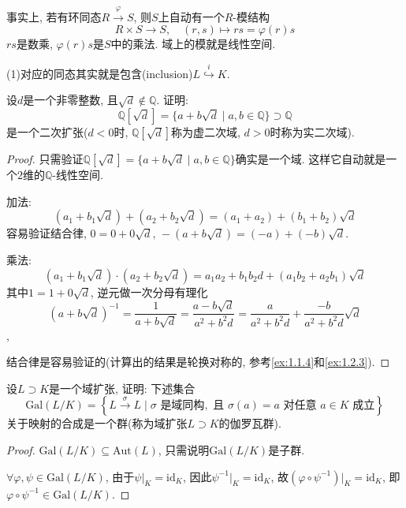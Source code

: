 \begin{remark}
    事实上, 若有环同态$R \overset{\varphi}\to S$, 则$S$上自动有一个$R$-模结构
    \[
        R \times S \to S, \quad (r, s) \mapsto rs = \varphi(r)s
    \]
    $rs$是数乘, $\varphi(r)s$是$S$中的乘法. 域上的模就是线性空间.
    
    (1)对应的同态其实就是包含(inclusion)$L \overset{i}\hookrightarrow K$.
\end{remark}

\begin{problem}
    设$d$是一个非零整数, 且$\sqrt d \notin \mathbb{Q}$. 证明:
    \[
        \mathbb{Q}[\sqrt{d}] = \{a + b\sqrt{d} \mid a, b \in \mathbb{Q}\} \supset \mathbb{Q}
    \]
    是一个二次扩张($d < 0$时, $\mathbb{Q}[\sqrt{d}]$称为虚二次域, $d > 0$时称为实二次域).
\end{problem}

\begin{proof}
    只需验证$\mathbb{Q}[\sqrt{d}] = \{a + b\sqrt{d} \mid a, b \in \mathbb{Q}\}$确实是一个域. 这样它自动就是一个$2$维的$\mathbb{Q}$-线性空间.
    
    加法:
    \[
        (a_1 + b_1\sqrt{d}) + (a_2 + b_2\sqrt{d}) = (a_1 + a_2) + (b_1 + b_2)\sqrt{d}
    \]
    容易验证结合律, $0 = 0 + 0\sqrt{d},\, -(a + b\sqrt{d}) = (-a) + (-b)\sqrt{d}$.
    
    乘法:
    \[
        (a_1 + b_1\sqrt{d}) \cdot (a_2 + b_2\sqrt{d}) = a_1a_2 + b_1b_2d + (a_1b_2 + a_2b_1)\sqrt{d}
    \]
    其中$1 = 1 + 0\sqrt{d}$, 逆元做一次分母有理化
    \[
        (a + b\sqrt{d})^{-1} = \frac{1}{a + b\sqrt{d}} = \frac{a - b\sqrt{d}}{a^2 + b^2d} = \frac{a}{a^2 + b^2d} + \frac{- b}{a^2 + b^2d}\sqrt{d}
    \],
    
    结合律是容易验证的(计算出的结果是轮换对称的, 参考\ref{ex:1.1.4}和\ref{ex:1.2.3}).
\end{proof}

\begin{problem}
    设$L \supset K$是一个域扩张, 证明: 下述集合
    \[
        \mathrm{Gal}(L/K) = \left\{L \xrightarrow{\sigma} L \mid \sigma\text{ 是域同构},\text{ 且 } \sigma(a) = a \text{ 对任意 } a \in K \text{ 成立}\right\}
    \]
    关于映射的合成是一个群(称为域扩张$L\supset K$的伽罗瓦群).
\end{problem}

\begin{proof}
    $\mathrm{Gal}(L/K) \subseteq \mathrm{Aut}(L)$, 只需说明$\mathrm{Gal}(L/K)$是子群.

    $\forall \varphi, \psi \in \mathrm{Gal}(L/K)$, 由于$\psi|_K = \mathrm{id}_K$, 因此$\psi^{-1}|_K = \mathrm{id}_K$, 故$(\varphi \circ \psi^{-1})|_K = \mathrm{id}_K$, 即$\varphi \circ \psi^{-1} \in \mathrm{Gal}(L/K)$.
\end{proof}

